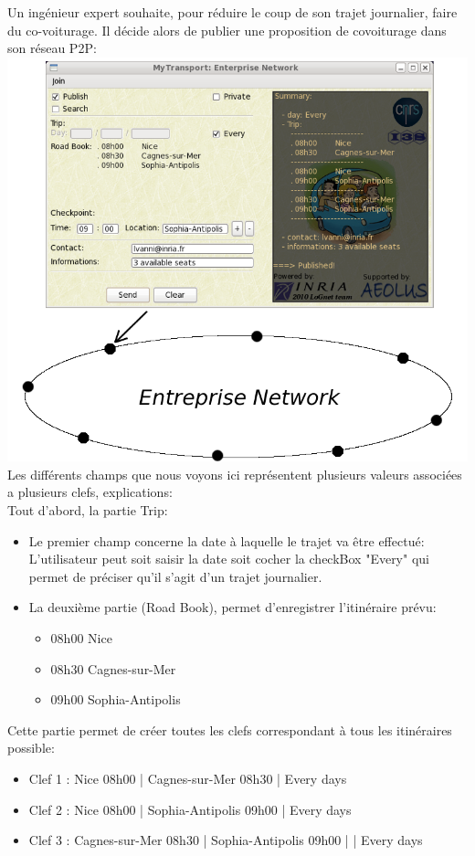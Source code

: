 Un ingénieur expert souhaite, pour réduire le coup de son trajet journalier, faire du co-voiturage. Il décide alors de publier une proposition de covoiturage dans son réseau P2P:\\ 

\includegraphics[scale=0.6]{img/screenshot/enterprisePub}\\

Les différents champs que nous voyons ici représentent plusieurs valeurs associées a plusieurs clefs, explications:\\
Tout d'abord, la partie Trip:
\begin{itemize}
\item Le premier champ concerne la date à laquelle le trajet va être effectué: L'utilisateur peut soit saisir la date soit cocher la checkBox "Every" qui permet de préciser qu'il s'agit d'un trajet journalier.
\item La deuxième partie (Road Book), permet d'enregistrer l'itinéraire prévu:
			\begin{itemize}
			\item 08h00 Nice
			\item 08h30 Cagnes-sur-Mer
			\item 09h00 Sophia-Antipolis
			\end{itemize}
\end{itemize}
Cette partie permet de créer toutes les clefs correspondant à tous les itinéraires possible:
\begin{itemize}
\item Clef 1 : Nice 08h00 | Cagnes-sur-Mer 08h30 | Every days
\item Clef 2 : Nice 08h00 | Sophia-Antipolis 09h00 | Every days
\item Clef 3 : Cagnes-sur-Mer 08h30 | Sophia-Antipolis 09h00 |  | Every days \\ ~ \\
\end{itemize}

